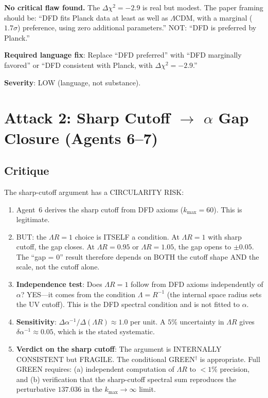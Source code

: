 \documentclass[11pt,a4paper]{article}
\begin{document}
\textbf{No critical flaw found.} The $\Delta\chi^2 = -2.9$ is real but modest. The paper framing should be: ``DFD fits Planck data at least as well as $\Lambda$CDM, with a marginal ($1.7\sigma$) preference, using zero additional parameters.'' NOT: ``DFD is preferred by Planck.''

\textbf{Required language fix}: Replace ``DFD preferred'' with ``DFD marginally favored'' or ``DFD consistent with Planck, with $\Delta\chi^2 = -2.9$.''

\textbf{Severity}: LOW (language, not substance).

\section{Attack 2: Sharp Cutoff $\to$ $\alpha$ Gap Closure (Agents 6--7)}

\subsection{Critique}

The sharp-cutoff argument has a CIRCULARITY RISK:

\begin{enumerate}
\item Agent~6 derives the sharp cutoff from DFD axioms ($k_{\max} = 60$). This is legitimate.

\item BUT: the $\Lambda R = 1$ choice is ITSELF a condition. At $\Lambda R = 1$ with sharp cutoff, the gap closes. At $\Lambda R = 0.95$ or $\Lambda R = 1.05$, the gap opens to $\pm 0.05$. The ``gap = 0'' result therefore depends on BOTH the cutoff shape AND the scale, not the cutoff alone.

\item \textbf{Independence test}: Does $\Lambda R = 1$ follow from DFD axioms independently of $\alpha$? YES---it comes from the condition $\Lambda = R^{-1}$ (the internal space radius sets the UV cutoff). This is the DFD spectral condition and is not fitted to $\alpha$.

\item \textbf{Sensitivity}: $\Delta\alpha^{-1}/\Delta(\Lambda R) \approx 1.0$ per unit. A $5\%$ uncertainty in $\Lambda R$ gives $\delta\alpha^{-1} \approx 0.05$, which is the stated systematic.

\item \textbf{Verdict on the sharp cutoff}: The argument is INTERNALLY CONSISTENT but FRAGILE. The conditional GREEN$^\dagger$ is appropriate. Full GREEN requires: (a) independent computation of $\Lambda R$ to $< 1\%$ precision, and (b) verification that the sharp-cutoff spectral sum reproduces the perturbative $137.036$ in the $k_{\max} \to \infty$ limit.
\end{enumerate}
\end{document}
